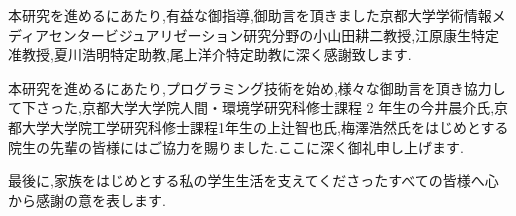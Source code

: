 本研究を進めるにあたり,有益な御指導,御助言を頂きました京都大学学術情報メディアセンタービジュアリゼーション研究分野の小山田耕二教授,江原康生特定准教授,夏川浩明特定助教,尾上洋介特定助教に深く感謝致します.

本研究を進めるにあたり,プログラミング技術を始め,様々な御助言を頂き協力して下さった,京都大学大学院人間・環境学研究科修士課程 2 年生の今井晨介氏,京都大学大学院工学研究科修士課程1年生の上辻智也氏,梅澤浩然氏をはじめとする院生の先輩の皆様にはご協力を賜りました.ここに深く御礼申し上げます.

最後に,家族をはじめとする私の学生生活を支えてくださったすべての皆様へ心から感謝の意を表します.
